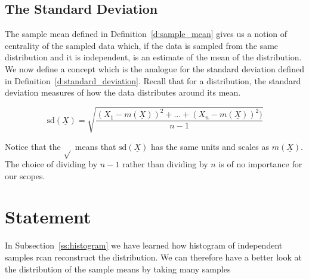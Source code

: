       \subsection{ The Standard Deviation}
      	The sample mean defined in Definition~\ref{d:sample_mean} gives us a notion of centrality of the sampled data which, if the data is sampled from the same distribution and it is independent, is an estimate of the mean of the distribution. We now define a concept which is the analogue for the standard deviation defined in Definition~\ref{d:standard_deviation}. Recall that for a distribution, the standard deviation measures of how the data distributes around its mean. 
      	\begin{definition}
      		\label{d:sampled_Standard_deviation}
      		\begin{equation}
      			\text{sd}(\underline X) =\sqrt{ \frac{ (X_1 - m(\underline X ))^2 + \ldots + (X_n - m(\underline X))^2)}{n-1}}
      		\end{equation}
      	\end{definition}
	Notice that the $\sqrt{}$ means that $\text{sd}(\underline X)$ has the same units and scales as $m(\underline X)$. The choice of dividing by $n-1$ rather than dividing by $n$ is of no importance for our scopes.


      \section{ Statement}
      
      In Subsection~\ref{ss:histogram} we have learned how histogram of independent samples rcan reconstruct the distribution. We can therefore have a better look at the distribution of the sample means by taking many samples 
      
